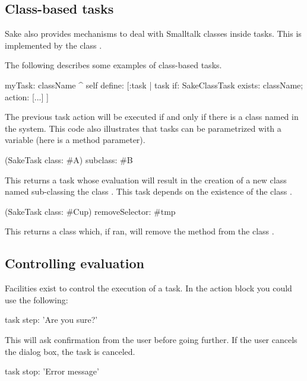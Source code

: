 \documentclass[a4paper,10pt,twoside]{book}
\begin{document}
\subsection{Class-based tasks}

Sake also provides mechanisms to deal with Smalltalk classes inside
tasks. This is implemented by the class .

The following describes some examples of class-based tasks.

\begin{code}{}
myTask: className
  ^ self define: [:task |
      task
        if: {SakeClassTask exists: className};
        action: [...]
    ]
\end{code}

The previous task action will be executed if and only if there is a
class named  in the system. This code also illustrates
that tasks can be parametrized with a variable (here  is
a method parameter).

\begin{code}{}
(SakeTask class: #A) subclass: #B
\end{code}

This returns a task whose evaluation will result in the creation of a
new class named  sub-classing the class . This task
depends on the existence of the class .

\begin{code}{}
(SakeTask class: #Cup) removeSelector: #tmp
\end{code}

This returns a class which, if ran, will remove the method 
from the class .

\subsection{Controlling evaluation}
\label{sec:contr-eval}

Facilities exist to control the execution of a task. In the action block you could use the following:

\begin{code}{}
task step: 'Are you sure?'
\end{code}

This will ask confirmation from the user before going further. If the user cancels the dialog box, the task is canceled.

\begin{code}{}
task stop: 'Error message'
\end{code}
\end{document}
